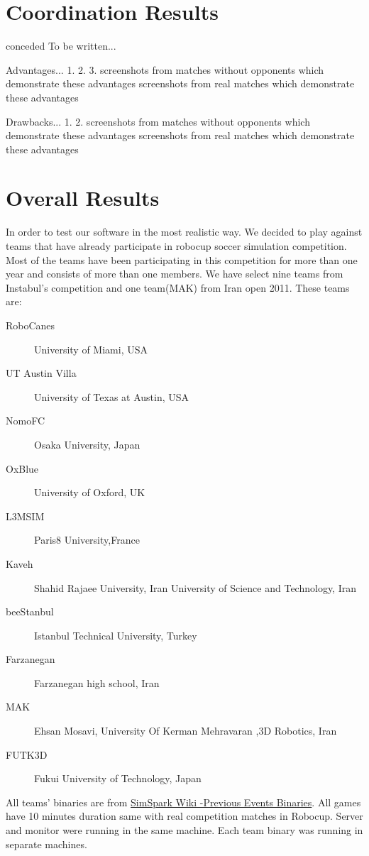 \section{Coordination Results}conceded
To be written...

Advantages...
1.
2.
3.
screenshots from matches without opponents which demonstrate these advantages
screenshots from real matches which demonstrate these advantages

Drawbacks...
1.
2.
screenshots from matches without opponents which demonstrate these advantages
screenshots from real matches which demonstrate these advantages

\section{Overall Results}
In order to test our software in the most realistic way. We decided to play against teams that have already participate in robocup soccer simulation competition. Most of the teams have been participating in this competition for more than one year and consists of more than one members. We have select nine teams from Instabul's competition and one team(MAK) from Iran open 2011. These teams are:
\begin{description}
\item[RoboCanes]	University of Miami, USA 
\item[UT Austin Villa]	University of Texas at Austin, USA
\item[NomoFC]	Osaka University, Japan
\item[OxBlue]	University of Oxford, UK
\item[L3MSIM]	Paris8 University,France
\item[Kaveh] 	Shahid Rajaee University, Iran University of Science and Technology, Iran
\item[beeStanbul]	Istanbul Technical University, Turkey
\item[Farzanegan]	Farzanegan high school, Iran
\item[MAK]	Ehsan Mosavi, University Of Kerman Mehravaran ,3D Robotics, Iran
\item[FUTK3D]	Fukui University of Technology, Japan
\end{description}
All teams' binaries are from \href{http://simspark.sourceforge.net/binaries/RoboCup2011/}{SimSpark Wiki -Previous Events Binaries}.
All games have 10 minutes duration same with real competition matches in Robocup. Server and monitor were running in the same machine\footnotemark. Each team binary was running in separate machines\footnotemark.
